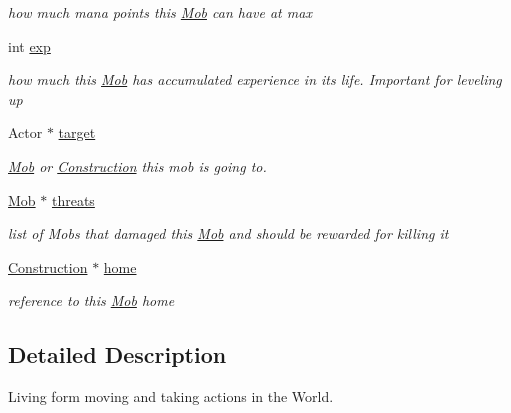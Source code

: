 \begin{DoxyCompactItemize}
\begin{DoxyCompactList}\small\item\em how much mana points this \hyperlink{class_mob}{Mob} can have at max \end{DoxyCompactList}\item 
int \hyperlink{class_mob_a30bc4209cc6c6294cd3c68943317e682}{exp}\hypertarget{class_mob_a30bc4209cc6c6294cd3c68943317e682}{}\label{class_mob_a30bc4209cc6c6294cd3c68943317e682}

\begin{DoxyCompactList}\small\item\em how much this \hyperlink{class_mob}{Mob} has accumulated experience in it\textquotesingle{}s life. Important for leveling up \end{DoxyCompactList}\item 
Actor $\ast$ \hyperlink{class_mob_a1bf86299dea0aa82c773a3b8d04d0593}{target}\hypertarget{class_mob_a1bf86299dea0aa82c773a3b8d04d0593}{}\label{class_mob_a1bf86299dea0aa82c773a3b8d04d0593}

\begin{DoxyCompactList}\small\item\em \hyperlink{class_mob}{Mob} or \hyperlink{class_construction}{Construction} this mob is going to. \end{DoxyCompactList}\item 
\hyperlink{class_mob}{Mob} $\ast$ \hyperlink{class_mob_a07f79a9fd434b9b26098b3b6d5d4a93e}{threats}\hypertarget{class_mob_a07f79a9fd434b9b26098b3b6d5d4a93e}{}\label{class_mob_a07f79a9fd434b9b26098b3b6d5d4a93e}

\begin{DoxyCompactList}\small\item\em list of Mobs that damaged this \hyperlink{class_mob}{Mob} and should be rewarded for killing it \end{DoxyCompactList}\item 
\hyperlink{class_construction}{Construction} $\ast$ \hyperlink{class_mob_ad3824bdc42d4041e184201c7801ab35e}{home}\hypertarget{class_mob_ad3824bdc42d4041e184201c7801ab35e}{}\label{class_mob_ad3824bdc42d4041e184201c7801ab35e}

\begin{DoxyCompactList}\small\item\em reference to this \hyperlink{class_mob}{Mob} home \end{DoxyCompactList}\end{DoxyCompactItemize}


\subsection{Detailed Description}
Living form moving and taking actions in the World. 

